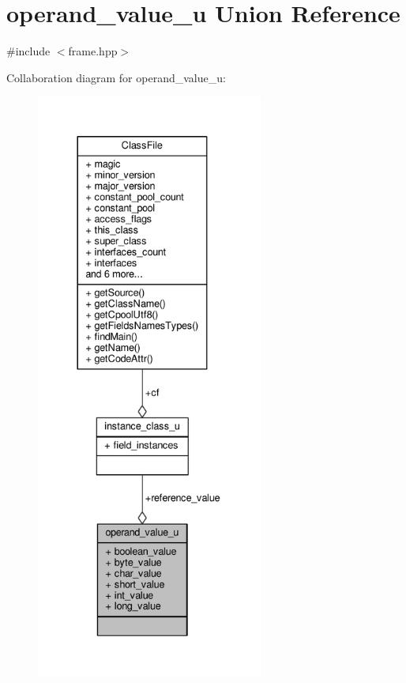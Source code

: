 \hypertarget{unionoperand__value__u}{\section{operand\+\_\+value\+\_\+u Union Reference}
\label{unionoperand__value__u}
}


{\ttfamily \#include $<$frame.\+hpp$>$}



Collaboration diagram for operand\+\_\+value\+\_\+u\+:\nopagebreak
\begin{figure}[H]
\begin{center}
\leavevmode
\includegraphics[height=550pt]{unionoperand__value__u__coll__graph}
\end{center}
\end{figure}
